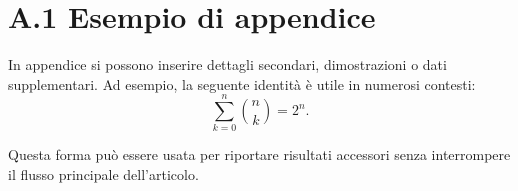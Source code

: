 \section*{A.1 Esempio di appendice}
In appendice si possono inserire dettagli secondari, dimostrazioni o dati supplementari. Ad esempio, la seguente identit\`a \`e utile in numerosi contesti:
\begin{equation}
\sum_{k=0}^{n} \binom{n}{k} = 2^n.
\end{equation}

Questa forma pu\`o essere usata per riportare risultati accessori senza interrompere il flusso principale dell'articolo.

